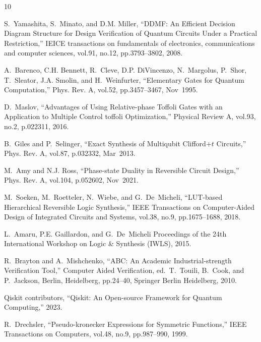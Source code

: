 \documentclass[paper]{ieice}
\begin{document}
%
\begin{thebibliography}{10}

S.~Yamashita, S.~Minato, and D.M. Miller, ``{DDMF}: {A}n {E}fficient
  {D}ecision {D}iagram {S}tructure for {D}esign {V}erification of {Q}uantum
  {C}ircuits {U}nder a {P}ractical {R}estriction,'' IEICE transactions on
  fundamentals of electronics, communications and computer sciences, vol.91,
  no.12, pp.3793--3802, 2008.

A.~Barenco, C.H. Bennett, R.~Cleve, D.P. DiVincenzo, N.~Margolus, P.~Shor,
  T.~Sleator, J.A. Smolin, and H.~Weinfurter, ``{E}lementary {G}ates for
  {Q}uantum {C}omputation,'' Phys. Rev. A, vol.52, pp.3457--3467, Nov\ 1995.

D.~Maslov, ``{A}dvantages of {U}sing {R}elative-phase {T}offoli {G}ates with an
  {A}pplication to {M}ultiple {C}ontrol toffoli {O}ptimization,'' Physical
  Review A, vol.93, no.2, p.022311, 2016.

B.~Giles and P.~Selinger, ``{E}xact {S}ynthesis of {M}ultiqubit {C}lifford+$t$
  {C}ircuits,'' Phys. Rev. A, vol.87, p.032332, Mar\ 2013.

M.~Amy and N.J. Ross, ``{P}hase-state {D}uality in {R}eversible {C}ircuit
  {D}esign,'' Phys. Rev. A, vol.104, p.052602, Nov\ 2021.

M.~Soeken, M.~Roetteler, N.~Wiebe, and G.~De~Micheli, ``{LUT-based}
  {H}ierarchical {R}eversible {L}ogic {S}ynthesis,'' IEEE Transactions on
  Computer-Aided Design of Integrated Circuits and Systems, vol.38, no.9,
  pp.1675--1688, 2018.

L.~Amaru, P.E. Gaillardon, and G.~De~Micheli Proceedings of the 24th
  International Workshop on Logic \& Synthesis (IWLS), 2015.

R.~Brayton and A.~Mishchenko, ``{ABC}: {A}n {A}cademic {I}ndustrial-strength
  {V}erification {T}ool,'' Computer Aided Verification, ed.~T.~Touili, B.~Cook,
  and P.~Jackson, Berlin, Heidelberg, pp.24--40, Springer Berlin Heidelberg,
  2010.

{Qiskit contributors}, ``{Q}iskit: {A}n {O}pen-source {F}ramework for {Q}uantum
  {C}omputing,'' 2023.

R.~Drechsler, ``{P}seudo-kronecker {E}xpressions for {S}ymmetric {F}unctions,''
  IEEE Transactions on Computers, vol.48, no.9, pp.987--990, 1999.

\end{thebibliography}
%
\end{document}
